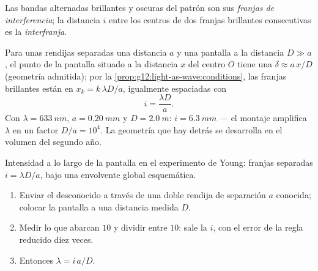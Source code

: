 \begin{definition}\label{def:g12:light-as-wave:fringes}
Las bandas alternadas brillantes y oscuras del patrón son sus
\emph{franjas de interferencia}; la
distancia $i$ entre los centros de dos franjas brillantes consecutivas
es la \emph{interfranja}.
\end{definition}

\begin{proposition}[La interfranja]\label{prop:g12:light-as-wave:interfringe}
Para unas rendijas separadas una distancia $a$ y una pantalla a la
distancia $D \gg a$, el punto de la pantalla situado a la distancia $x$
del centro $O$ tiene una 
$\delta \approx a\,x/D$ (geometría admitida); por la
\cref{prop:g12:light-as-wave:conditions}, las franjas brillantes están
en $x_k = k\,\lambda D/a$, igualmente espaciadas con 
\[
i = \frac{\lambda D}{a}.
\]
Con $\lambda = \qty{633}{nm}$, $a = \qty{0.20}{mm}$ y
$D = \qty{2.0}{m}$: $i = \qty{6.3}{mm}$ --- el montaje amplifica
$\lambda$ en un factor $D/a = 10^4$. La geometría que hay detrás se
desarrolla en el volumen del segundo año.
\end{proposition}
\admitted

\begin{omfigure}

{\small Intensidad a lo largo de la pantalla en el experimento de Young:
franjas separadas $i = \lambda D/a$, bajo una envolvente global
esquemática.}
\end{omfigure}

\begin{method}\label{met:g12:light-as-wave:lambda}
\begin{enumerate}
  \item Enviar el  desconocido a través de una doble rendija de
        separación $a$ conocida; colocar la pantalla a una distancia
        medida $D$.
  \item Medir lo que abarcan $10$  y dividir entre $10$: sale
        la  $i$, con el error de la regla reducido diez
        veces.
  \item Entonces $\lambda = i\,a/D$.
\end{enumerate}
\end{method}

